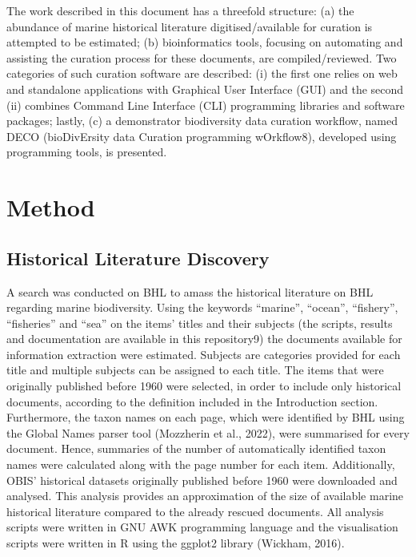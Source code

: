 The work described in this document has a threefold structure: (a) the abundance of marine historical literature digitised/available for curation is attempted to be estimated; (b) bioinformatics tools, focusing on automating and assisting the curation process for these documents, are compiled/reviewed. Two categories of such curation software are described: (i) the first one relies on web and standalone applications with Graphical User Interface (GUI) and the second (ii) combines Command Line Interface (CLI) programming libraries and software packages; lastly, (c) a demonstrator biodiversity data curation workflow, named DECO (bioDivErsity data Curation programming wOrkflow8), developed using programming tools, is presented.

\section{Method}
\label{sec:deco-method}

    \subsection{Historical Literature Discovery}
A search was conducted on BHL to amass the historical literature on BHL regarding marine biodiversity. Using the keywords “marine”, “ocean”, “fishery”, “fisheries” and “sea” on the items’ titles and their subjects (the scripts, results and documentation are available in this repository9) the documents available for information extraction were estimated. Subjects are categories provided for each title and multiple subjects can be assigned to each title. The items that were originally published before 1960 were selected, in order to include only historical documents, according to the definition included in the Introduction section. Furthermore, the taxon names on each page, which were identified by BHL using the Global Names parser tool (Mozzherin et al., 2022), were summarised for every document. Hence, summaries of the number of automatically identified taxon names were calculated along with the page number for each item. Additionally, OBIS’ historical datasets originally published before 1960 were downloaded and analysed. This analysis provides an approximation of the size of available marine historical literature compared to the already rescued documents. All analysis scripts were written in GNU AWK programming language and the visualisation scripts were written in R using the ggplot2 library (Wickham, 2016).



